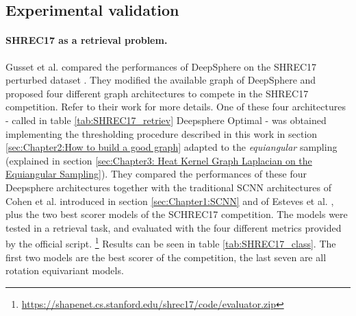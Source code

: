 \subsection{Experimental validation}
\label{sec:Chapter2:Experimental validation}
\paragraph{SHREC17 as a retrieval problem.}
Gusset et al. \cite{Gusset} compared the performances of DeepSphere on the SHREC17 perturbed dataset \cite{SHREC17}. They modified the available graph of DeepSphere and proposed four different graph architectures to compete in the SHREC17 competition. Refer to their work for more details. One of these four architectures - called in table \ref{tab:SHREC17_retriev} Deepsphere Optimal - was obtained implementing the thresholding procedure described in this work in section \ref{sec:Chapter2:How to build a good graph} adapted to the \textit{equiangular} sampling (explained in section \ref{sec:Chapter3: Heat Kernel Graph Laplacian on the Equiangular Sampling}). They compared the performances of these four Deepsphere architectures together with the traditional SCNN architectures of Cohen et al. \cite{SCNN} introduced in section \ref{sec:Chapter1:SCNN} and of Esteves et al. \cite{Esteves}, plus the two best scorer models of the SCHREC17 competition. The models were tested in a retrieval task, and evaluated with the four different metrics provided by the official script. \footnote{\url{https://shapenet.cs.stanford.edu/shrec17/code/evaluator.zip}} Results can be seen in table \ref{tab:SHREC17_class}.  The first two models are the best scorer of the competition, the last seven are all rotation equivariant models.

